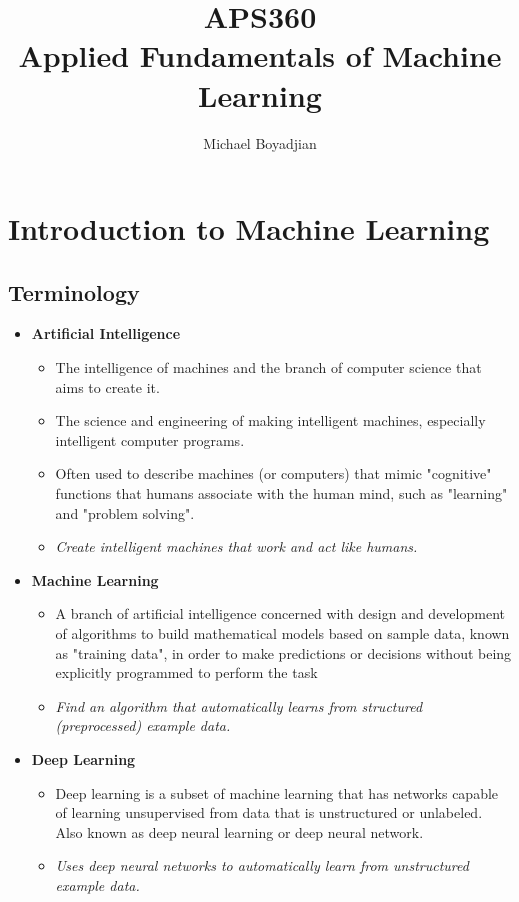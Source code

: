 \documentclass[11pt]{article}
\begin{document}
\title{APS360  \\ Applied Fundamentals of Machine Learning}
\author{Michael Boyadjian}
\maketitle
\pagebreak

\tableofcontents

\pagebreak

\bigskip
\bigskip
\bigskip

\section{Introduction to Machine Learning}

\subsection{Terminology}
\begin{itemize}
\item \textbf{Artificial Intelligence}
\begin{itemize}
\item The intelligence of machines and the branch of computer science that aims to create it.
\item The science and engineering of making intelligent machines, especially intelligent computer programs.
\item Often used to describe machines (or computers) that mimic "cognitive" functions that humans associate with the human mind, such as "learning" and "problem solving".
\item \textit{Create intelligent machines that work and act like humans.}
\end{itemize}
\item \textbf{Machine Learning}
\begin{itemize}
\item A branch of artificial intelligence concerned with design and development of algorithms to build mathematical models based on sample data, known as "training data", in order to make predictions or decisions without being explicitly programmed to perform the task
\item \textit{Find an algorithm that automatically learns from structured (preprocessed) example data.}
\end{itemize}
\item \textbf{Deep Learning}
\begin{itemize}
\item Deep learning is a subset of machine learning that has networks capable of learning unsupervised from data that is unstructured or unlabeled. Also known as deep neural learning or deep neural network.
\item \textit{Uses deep neural networks to automatically learn from unstructured example data.}
\end{itemize}
\end{itemize}
\end{document}
